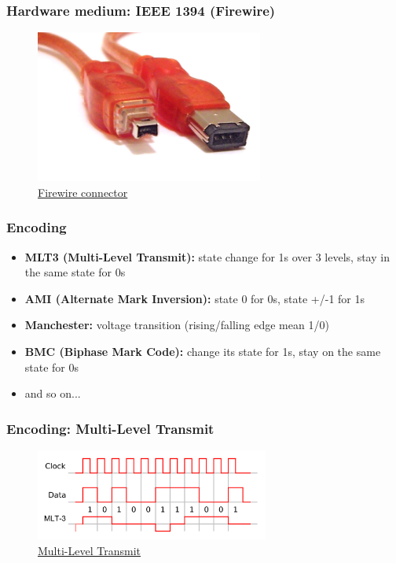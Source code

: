   \begin{frame}
    \frametitle{Hardware medium: IEEE 1394 (Firewire)}
    \begin{figure}[t]
      \centering
      \includegraphics[height=5cm]{./imgs/firewire.jpg}
      \caption{\color{blue}\href{https://upload.wikimedia.org/wikipedia/commons/thumb/f/f7/FireWire_cables.jpg/800px-FireWire_cables.jpg}{Firewire connector}}
      \label{fig:firewire}
    \end{figure}
  \end{frame}
  \begin{frame}
    \frametitle{Encoding}
      \begin{itemize}
        \item \textbf{MLT3 (Multi-Level Transmit):} state change for 1s over 3 levels, stay in the same state for 0s
        \item \textbf{AMI (Alternate Mark Inversion):} state 0 for 0s, state +/-1 for 1s
        \item \textbf{Manchester:} voltage transition (rising/falling edge mean 1/0)
        \item \textbf{BMC (Biphase Mark Code):} change its state for 1s, stay on the same state for 0s
        \item and so on...
      \end{itemize}
  \end{frame}
  \begin{frame}
    \frametitle{Encoding: Multi-Level Transmit}
    \begin{figure}[t]
      \centering
      \includegraphics[height=3cm]{./imgs/mlt3.png}
      \caption{\color{blue}\href{https://upload.wikimedia.org/wikipedia/commons/thumb/b/b4/MLT3encoding.svg/1456px-MLT3encoding.svg.png}{Multi-Level Transmit}}
      \label{fig:mlt3}
    \end{figure}
  \end{frame}
